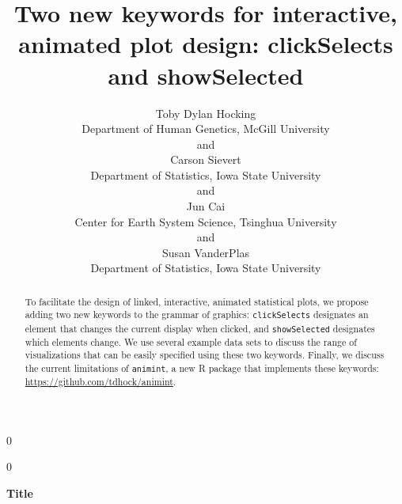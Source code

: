 \documentclass[12pt]{article}\usepackage[]{graphicx}\usepackage[]{color}
\newcommand{\blind}{0}
\begin{document}
%

\def\spacingset#1{\renewcommand{\baselinestretch}%
{#1}\small\normalsize} \spacingset{1}



\blind
{
  \title{\bf Two new keywords for interactive, animated plot design:
  clickSelects and showSelected}
  \author{Toby Dylan Hocking%
  \hspace{.2cm}\\
    Department of Human Genetics, McGill University\\
    and \\
    Carson Sievert
    \hspace{.2cm}\\
    Department of Statistics, Iowa State University \\
    and \\
    Jun Cai
    \hspace{.2cm}\\
    Center for Earth System Science, Tsinghua University\\
    and \\
    Susan VanderPlas 
    \hspace{.2cm}\\
    Department of Statistics, Iowa State University}
  \maketitle
} \fi

\blind
{
  \bigskip
  \bigskip
  \bigskip
  \begin{center}
    {\LARGE\bf Title}
  \end{center}
  \medskip
} \fi

\bigskip
\begin{abstract}
  To facilitate the design of linked, interactive, animated
  statistical plots, we propose adding two new keywords to the grammar
  of graphics: \texttt{clickSelects} designates an element that
  changes the current display when clicked, and \texttt{showSelected}
  designates which elements change. We use several example data sets
  to discuss the range of visualizations that can be easily specified
  using these two keywords. Finally, we discuss the current
  limitations of \texttt{animint}, a new R package that implements these
  keywords: \url{https://github.com/tdhock/animint}.
\end{abstract}
\end{document}
